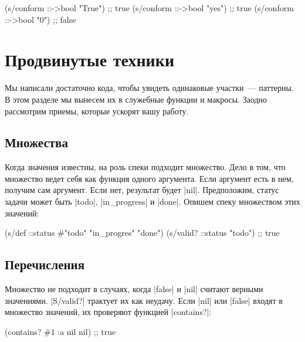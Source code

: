 \begin{english}
  \begin{clojure}
(s/conform ::->bool "True") ;; true
(s/conform ::->bool "yes")  ;; true
(s/conform ::->bool "0")    ;; false
  \end{clojure}
\end{english}

\section{Продвинутые техники}

Мы написали достаточно кода, чтобы увидеть одинаковые участки~--- паттерны. В
этом разделе мы вынесем их в служебные функции и макросы. Заодно рассмотрим
приемы, которые ускорят вашу работу.

\subsection{Множества}

Когда значения известны, на роль спеки подходит множество. Дело в том, что
множество ведет себя как функция одного аргумента. Если аргумент есть в нем,
получим сам аргумент. Если нет, результат будет \spverb|nil|. Предположим,
статус задачи может быть \spverb|todo|, \spverb|in_progress| и
\spverb|done|. Опишем спеку множеством этих значений:

\begin{english}
  \begin{clojure}
(s/def ::status #{"todo" "in_progres" "done"})
(s/valid? ::status "todo") ;; true
  \end{clojure}
\end{english}

\subsection{Перечисления}

Множество не подходит в случаях, когда \spverb|false| и \spverb|nil| считают
верными значениями. \spverb|S/valid?| трактует их как неудачу. Если \spverb|nil|
или \spverb|false| входят в множество значений, их проверяют функцией
\spverb|contains?|:

\begin{english}
  \begin{clojure}
(contains? #{1 :a nil} nil) ;; true
  \end{clojure}
\end{english}

